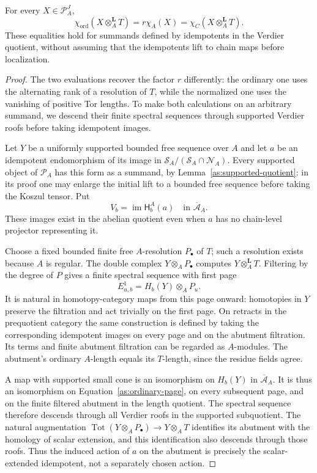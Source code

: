 \begin{proposition}
\label{as:base-equality}
For every $X\in\mathcal P_A^J$,
\[
 \chi_{\mathrm{ord}}(X\otimes_A^{\mathbf L}T)
   =r\chi_A(X)
   =\chi_C(X\otimes_A^{\mathbf L}T).
\]
These equalities hold for summands defined by idempotents in the
Verdier quotient, without assuming that the idempotents lift to
chain maps before localization.
\end{proposition}

\begin{proof}
The two evaluations recover the factor $r$ differently: the ordinary
one uses the alternating rank of a resolution of $T$, while the
normalized one uses the vanishing of positive Tor lengths. To make
both calculations on an arbitrary summand, we descend their finite
spectral sequences through supported Verdier roofs before taking
idempotent images.

Let $Y$ be a uniformly supported bounded free sequence over $A$ and
let $a$ be an idempotent endomorphism of its image in
$\mathcal S_A/(\mathcal S_A\cap\mathcal N_A)$. Every supported
object of $\mathcal P_A$ has this form as a summand, by
Lemma~\ref{as:supported-quotient}: in its proof one may enlarge the
initial lift to a bounded free sequence before taking the Koszul
tensor. Put
\[
 V_b=\operatorname{im}\mathsf H_b^A(a)
       \quad\text{in }\overline{\mathcal A}_A.
\]
These images exist in the abelian quotient even when $a$ has no
chain-level projector representing it.

Choose a fixed bounded finite free $A$-resolution $P_\bullet$ of
$T$; such a resolution exists because $A$ is regular. The double
complex $Y\otimes_A P_\bullet$ computes
$Y\otimes_A^{\mathbf L}T$. Filtering by the degree of $P$ gives
a finite spectral sequence with first page
\begin{equation}
 E^1_{u,b}=H_b(Y)\otimes_A P_u.
 \label{as:ordinary-page}
\end{equation}
It is natural in homotopy-category maps from this page onward:
homotopies in $Y$ preserve the filtration and act trivially on
the first page. On retracts in the prequotient category the same
construction is defined by taking the corresponding idempotent
images on every page and on the abutment filtration. Its terms
and finite abutment filtration can be
regarded as $A$-modules. The abutment's ordinary $A$-length equals
its $T$-length, since the residue fields agree.

A map with supported small cone is an isomorphism on $H_b(Y)$
in $\overline{\mathcal A}_A$. It is thus an isomorphism on
Equation~\eqref{as:ordinary-page}, on every subsequent page, and
on the finite filtered abutment in the length quotient. The
spectral sequence therefore descends through all Verdier roofs
in the supported subquotient. The natural augmentation
$\operatorname{Tot}(Y\otimes_A P_\bullet)\to Y\otimes_A T$
identifies its abutment with the homology of scalar extension,
and this identification also descends through those roofs.
Thus the induced action of $a$ on the abutment is precisely the
scalar-extended idempotent, not a separately chosen action.


\end{proof}
